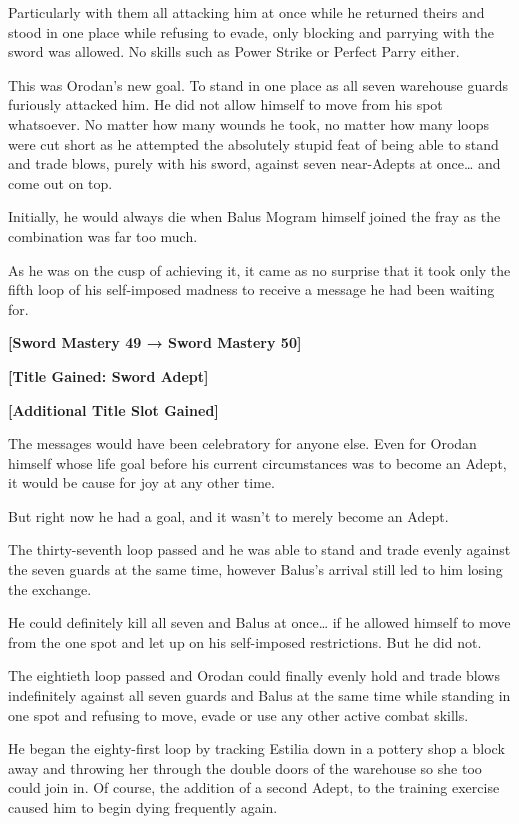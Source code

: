 \documentclass[a4paper,10pt]{book}
\begin{document}
Particularly with them all attacking him at once while he returned theirs and stood in one place while refusing to evade, only blocking and parrying with the sword was allowed. No skills such as Power Strike or Perfect Parry either.\par
This was Orodan’s new goal. To stand in one place as all seven warehouse guards furiously attacked him. He did not allow himself to move from his spot whatsoever. No matter how many wounds he took, no matter how many loops were cut short as he attempted the absolutely stupid feat of being able to stand and trade blows, purely with his sword, against seven near-Adepts at once… and come out on top.\par
Initially, he would always die when Balus Mogram himself joined the fray as the combination was far too much.\par
As he was on the cusp of achieving it, it came as no surprise that it took only the fifth loop of his self-imposed madness to receive a message he had been waiting for.\par
\textbf{[Sword Mastery 49 → Sword Mastery 50]}\par
\textbf{[Title Gained: Sword Adept]}\par
\textbf{[Additional Title Slot Gained]}\par
The messages would have been celebratory for anyone else. Even for Orodan himself whose life goal before his current circumstances was to become an Adept, it would be cause for joy at any other time.\par
But right now he had a goal, and it wasn’t to merely become an Adept.\par
The thirty-seventh loop passed and he was able to stand and trade evenly against the seven guards at the same time, however Balus’s arrival still led to him losing the exchange.\par
He could definitely kill all seven and Balus at once… if he allowed himself to move from the one spot and let up on his self-imposed restrictions. But he did not.\par
The eightieth loop passed and Orodan could finally evenly hold and trade blows indefinitely against all seven guards and Balus at the same time while standing in one spot and refusing to move, evade or use any other active combat skills.\par
He began the eighty-first loop by tracking Estilia down in a pottery shop a block away and throwing her through the double doors of the warehouse so she too could join in. Of course, the addition of a second Adept, to the training exercise caused him to begin dying frequently again.\par
\end{document}
